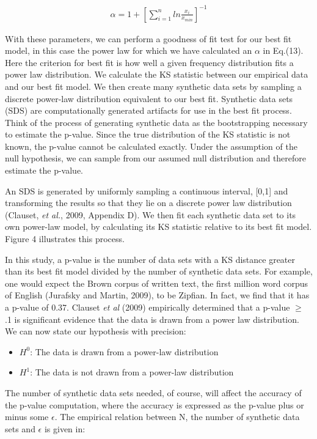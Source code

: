 \documentclass[12pt]{article}
\begin{document}
\begin{align}
\alpha = 1 +\left[ \sum_{i=1}^{n}ln\frac{x_i}{x_{min}}\right]^{-1}
\end{align}

With these parameters, we can perform a goodness of fit test for our best fit model, in this case the power law for which we have calculated an $\alpha$ in Eq.(13). Here the criterion for best fit is how well a given frequency distribution fits a power law distribution. We calculate the KS statistic between our empirical data and our best fit model.  We then create many synthetic data sets by sampling a discrete power-law distribution equivalent to our best fit. Synthetic data sets (SDS) are computationally generated artifacts for use in the best fit process. 
Think of the process of generating synthetic data as the bootstrapping necessary to estimate the p-value.  Since the true distribution of the KS statistic is not known, the p-value cannot be calculated exactly. Under the assumption of the null hypothesis, we can sample from our assumed null distribution and therefore estimate the p-value.

An SDS is generated by uniformly sampling a continuous interval, [0,1]  and transforming the results so that they lie on a discrete power law distribution (Clauset, \emph{et al.}, 2009, Appendix D).  We then fit each synthetic data set to its own power-law model, by calculating its KS statistic relative to its best fit model. Figure 4 illustrates this process.  

In this study, a p-value is the number of data sets with a KS distance greater than its best fit model divided by the number of synthetic data sets.   For example, one would expect the Brown corpus of written text, the first million word corpus of English (Jurafsky and Martin, 2009), to be Zipfian.  In fact, we find that it has a p-value of 0.37.  Clauset \emph{et al} (2009) empirically determined that a p-value $\geq$ .1 is significant evidence that the data is drawn from a power law distribution.  We can now state our hypothesis with precision:

\begin{itemize}
\item $H^0$: The data is drawn from a power-law distribution
\item $H^1$: The data is not drawn from a power-law distribution
\end{itemize}

The number of synthetic data sets needed, of course, will affect the accuracy of the p-value computation, where the accuracy is expressed as the p-value plus or minus some $\epsilon$. The empirical relation between N, the number of synthetic data sets and  $\epsilon$ is given in: 
\end{document}
